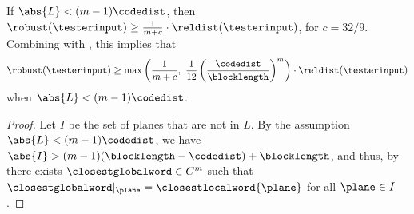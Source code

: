 \documentclass{toc}
\theoremstyle{plain}
\begin{document}
\begin{claim}
\label{claim:m}
If $\abs{L} < (m-1)\codedist$, then $\robust(\testerinput) \geq \frac{1}{m + c} \cdot \reldist(\testerinput)$, for $c = 32/9$. Combining with , this implies that
\[
  \robust(\testerinput) \geq \max \left(\frac{1}{m + c},\  \frac{1}{12} \left(\frac{\codedist}{\blocklength}\right)^m\right) \cdot \reldist(\testerinput)
\]
when $\abs{L} < (m-1)\codedist$.
\end{claim}

\begin{proof}
Let $I$ be the set of planes that are not in $L$.
By the assumption $\abs{L} < (m-1)\codedist$, we have $\abs{I} > (m-1)(\blocklength-\codedist) + \blocklength$,
and thus, by  there exists
$\closestglobalword \in C^m$ such that $\closestglobalword \vert_{\plane} = \closestlocalword{\plane}$ for all $\plane \in I$.


\end{proof}
\end{document}

